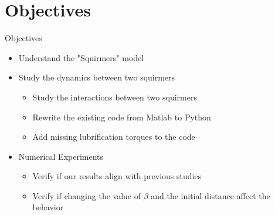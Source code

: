 \documentclass{beamer}
\begin{document}
\section{Objectives}
\begin{frame}{Objectives}
    \begin{itemize}
        \item Understand the "Squirmers" model
        \item Study the dynamics between two squirmers
        \begin{itemize}
            \item Study the interactions between two squirmers \cite{Brumley}\cite{Lauga}
            \item Rewrite the existing code from Matlab to Python
            \item Add missing lubrification torques to the code
        \end{itemize}
        \item Numerical Experiments
        \begin{itemize}
            \item Verify if our results align with previous studies\cite{Brumley}\cite{Lauga}\cite{Stark}
            \item Verify if changing the value of $\beta$ and the initial distance affect the behavior
        \end{itemize}
    \end{itemize}
\end{frame}
\end{document}
